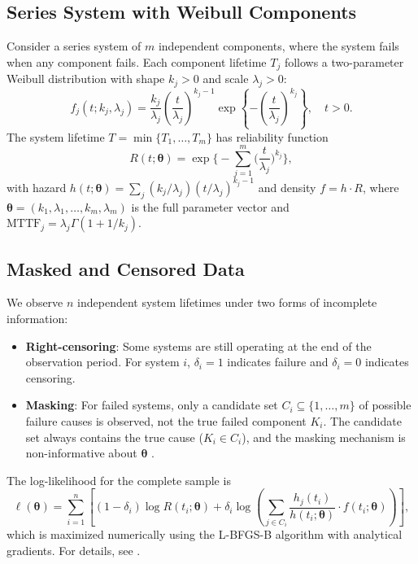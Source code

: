 \documentclass[11pt]{article}
\renewcommand{\v}[1]{\boldsymbol{#1}}
\begin{document}
\subsection{Series System with Weibull Components}

Consider a series system of $m$ independent components, where the system fails when any component fails. Each component lifetime $T_j$ follows a two-parameter Weibull distribution with shape $k_j > 0$ and scale $\lambda_j > 0$:
\begin{equation}
f_j(t; k_j, \lambda_j) = \frac{k_j}{\lambda_j}\left(\frac{t}{\lambda_j}\right)^{k_j-1} \exp\left\{-\left(\frac{t}{\lambda_j}\right)^{k_j}\right\}, \quad t > 0.
\end{equation}
The system lifetime $T = \min\{T_1, \ldots, T_m\}$ has reliability function
\begin{equation}
\label{eq:sys_reliability}
R(t;\v\theta) = \exp\biggl\{-\sum_{j=1}^{m}\biggl(\frac{t}{\lambda_j}\biggr)^{k_j}\biggr\},
\end{equation}
with hazard $h(t;\v\theta) = \sum_j (k_j/\lambda_j)(t/\lambda_j)^{k_j-1}$ and density $f = h \cdot R$,
where $\v\theta = (k_1, \lambda_1, \ldots, k_m, \lambda_m)$ is the full parameter vector and $\text{MTTF}_j = \lambda_j \Gamma(1 + 1/k_j)$.

\subsection{Masked and Censored Data}

We observe $n$ independent system lifetimes under two forms of incomplete information:
\begin{itemize}
\item \textbf{Right-censoring}: Some systems are still operating at the end of the observation period. For system $i$, $\delta_i = 1$ indicates failure and $\delta_i = 0$ indicates censoring.
\item \textbf{Masking}: For failed systems, only a candidate set $C_i \subseteq \{1, \ldots, m\}$ of possible failure causes is observed, not the true failed component $K_i$. The candidate set always contains the true cause ($K_i \in C_i$), and the masking mechanism is non-informative about $\v\theta$ \citep{towell2023reliability}.
\end{itemize}

The log-likelihood for the complete sample is
\begin{equation}
\label{eq:loglik}
\ell(\v\theta) = \sum_{i=1}^{n} \left[ (1-\delta_i) \log R(t_i; \v\theta) + \delta_i \log \left( \sum_{j \in C_i} \frac{h_j(t_i)}{h(t_i; \v\theta)} \cdot f(t_i; \v\theta) \right) \right],
\end{equation}
which is maximized numerically using the L-BFGS-B algorithm \citep{byrd1995} with analytical gradients. For details, see \citep{towell2023reliability}.
\end{document}
